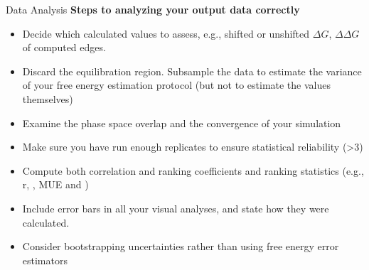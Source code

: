 \documentclass[9pt,bestpractices]{livecoms}
\begin{document}
\begin{Checklists*}
\begin{checklist}{Data Analysis}
    \textbf{Steps to analyzing your output data correctly}
\begin{itemize}
    \item Decide which calculated values to assess, e.g., shifted or unshifted $\Delta G$,  $\Delta \Delta G$ of computed edges.
    \item Discard the equilibration region. Subsample the data to estimate the variance of your free energy estimation protocol (but not to estimate the values themselves)
    \item Examine the phase space overlap and the convergence of your simulation
    \item Make sure you have run enough replicates to ensure statistical reliability (\textgreater3)
    \item Compute both correlation and ranking coefficients and ranking statistics (e.g., r, \textrho, MUE and \texttau)
    \item Include error bars in all your visual analyses, and state how they were calculated.
    \item Consider bootstrapping uncertainties rather than using free energy error estimators
\end{itemize}
\end{checklist}
\end{Checklists*}
\clearpage
\end{document}
